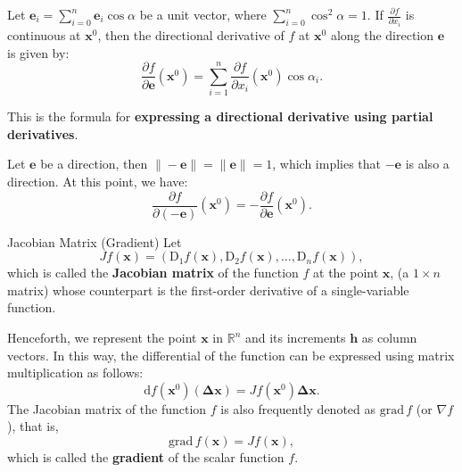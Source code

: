 \documentclass[11pt]{../../TexTemplate/elegantbook}
\begin{document}
Let \(\mathbf{e}_{i}=\sum_{i=0}^{n} \mathbf{e}_{i}\cos\alpha\) be a unit vector, 
where \(\sum_{i=0}^{n} \cos^2\alpha = 1\).
If \(\frac{\partial f}{\partial x_{i}}\) is continuous at \(\mathbf{x}^0\), 
then the directional derivative of \(f\) at \(\mathbf{x}^0\) along the direction \(\mathbf{e}\) is given by:
\[
\frac{\partial f}{\partial \mathbf{e}}(\mathbf{x}^0) = \sum_{i=1}^n \frac{\partial f}{\partial x_i}(\mathbf{x}^0) \cos \alpha_i.
\]

This is the formula for \textbf{expressing a directional derivative using partial derivatives}.


\begin{note}
    Let \(\mathbf{e}\) be a direction, then \(\|-\mathbf{e}\| = \|\mathbf{e}\| = 1\), 
    which implies that \(-\mathbf{e}\) is also a direction. At this point, we have:
    \[
    \frac{\partial f}{\partial (-\mathbf{e})}(\mathbf{x}^{0}) = -\frac{\partial f}{\partial \mathbf{e}}(\mathbf{x}^{0}).
    \]
\end{note}



\begin{definition}{Jacobian Matrix (Gradient)}
    Let
    \[
    Jf(\mathbf{x}) = (\mathrm{D}_1 f(\mathbf{x}), \mathrm{D}_2 f(\mathbf{x}), \dots, \mathrm{D}_n f(\mathbf{x})),
    \]
    which is called the \textbf{Jacobian matrix} of the function \( f \) at the point \( \mathbf{x} \), 
    (a \( 1 \times n \) matrix) whose counterpart is the first-order derivative of a single-variable function.

    Henceforth, we represent the point \(\mathbf{x}\) in \( \mathbb{R}^n \) 
    and its increments \(\mathbf{h}\) as column vectors.
    In this way, the differential of the function can be expressed using matrix multiplication as follows:
    \[
    \mathrm{d}f(\mathbf{x}^{0})(\mathbf{\Delta x}) = Jf(\mathbf{x}^{0}) \mathbf{\Delta x}.
    \]
    The Jacobian matrix of the function \( f \) is also frequently denoted as 
    \(\mathrm{grad}\,f\) (or \(\nabla f\)), that is,
    \[
    \mathrm{grad}\,f(\mathbf{x}) = Jf(\mathbf{x}),
    \]
    which is called the \textbf{gradient} of the scalar function \( f \).
\end{definition}
\end{document}
